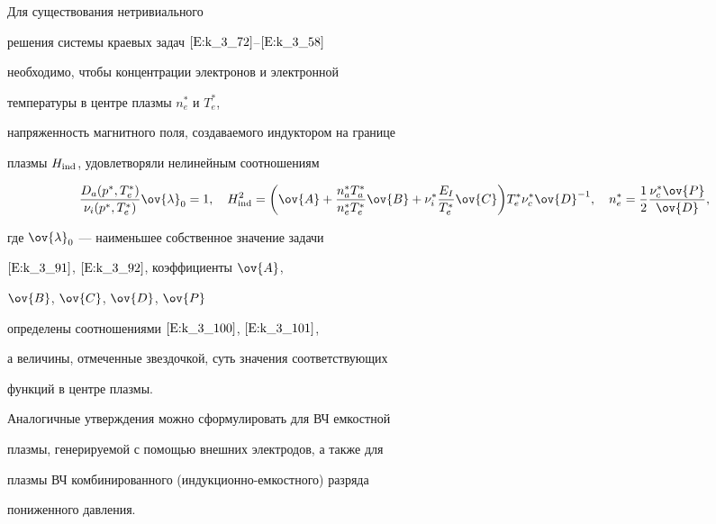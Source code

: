 \begin{assrtnonum}


Для существования нетривиального


решения системы краевых задач $\eqref{E:k_3_72}$--$\eqref{E:k_3_58}$


необходимо, чтобы концентрации электронов и электронной


температуры в центре плазмы $n_e^\ast$ и $T_e^\ast$,


напряженность магнитного поля, создаваемого индуктором на границе


плазмы $H_{\operatorname{ind}}$, удовлетворяли нелинейным соотношениям


\begin{equation}


\frac {D_a(p^\ast, T_e^\ast)}{{\nu}_{i} (p^\ast, T_e^\ast)}


\ov{\lambda}_0=1, \quad H_{\ind}^2=\bigg(


\ov{A}+\frac{n_a^\ast T_a^\ast}{n_e^\ast T_e^\ast}\ov{B}+


\nu_i ^\ast \frac{E_I}{T_e^\ast}\ov{C}\bigg)


T_e^\ast \nu_c ^\ast \ov{D}^{-1}, \quad


n_e^\ast=\frac{1}{2}\frac {\nu_c^\ast \ov{P}}{\ov{D}}, \label{E:Razr}


\end{equation}


где $\ov{\lambda}_0$ --- наименьшее собственное значение задачи


$\eqref{E:k_3_91}$, $\eqref{E:k_3_92}$, коэффициенты $\ov{A}$,


$\ov{B}$, $\ov{C}$, $\ov{D}$, $\ov{P}$


определены соотношениями $\eqref{E:k_3_100}$, $\eqref{E:k_3_101}$,


а величины, отмеченные звездочкой, суть значения соответствующих


функций в центре плазмы.


\end{assrtnonum}





Аналогичные утверждения можно сформулировать для ВЧ емкостной


плазмы, генерируемой с помощью внешних электродов, а также для


плазмы ВЧ комбинированного (индукционно-емкостного) разряда


пониженного давления.








